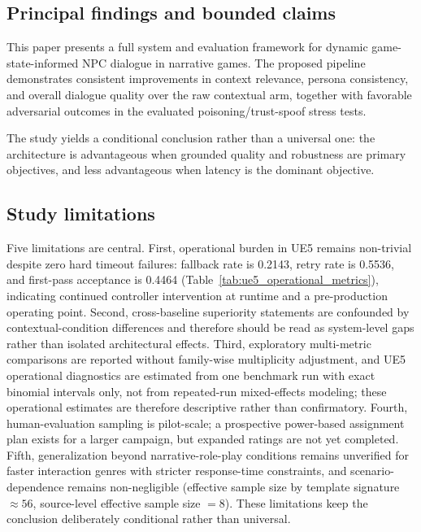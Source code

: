 ﻿\documentclass[a4paper,12pt]{article}
\begin{document}
\subsection{Principal findings and bounded claims}
This paper presents a full system and evaluation framework for dynamic game-state-informed NPC dialogue in narrative games. The proposed pipeline demonstrates consistent improvements in context relevance, persona consistency, and overall dialogue quality over the raw contextual arm, together with favorable adversarial outcomes in the evaluated poisoning/trust-spoof stress tests.

The study yields a conditional conclusion rather than a universal one: the architecture is advantageous when grounded quality and robustness are primary objectives, and less advantageous when latency is the dominant objective.

\subsection{Study limitations}
Five limitations are central. First, operational burden in UE5 remains non-trivial despite zero hard timeout failures: fallback rate is 0.2143, retry rate is 0.5536, and first-pass acceptance is 0.4464 (Table~\ref{tab:ue5_operational_metrics}), indicating continued controller intervention at runtime and a pre-production operating point. Second, cross-baseline superiority statements are confounded by contextual-condition differences and therefore should be read as system-level gaps rather than isolated architectural effects. Third, exploratory multi-metric comparisons are reported without family-wise multiplicity adjustment, and UE5 operational diagnostics are estimated from one benchmark run with exact binomial intervals only, not from repeated-run mixed-effects modeling; these operational estimates are therefore descriptive rather than confirmatory. Fourth, human-evaluation sampling is pilot-scale; a prospective power-based assignment plan exists for a larger campaign, but expanded ratings are not yet completed. Fifth, generalization beyond narrative-role-play conditions remains unverified for faster interaction genres with stricter response-time constraints, and scenario-dependence remains non-negligible (effective sample size by template signature \(\approx 56\), source-level effective sample size \(=8\)). These limitations keep the conclusion deliberately conditional rather than universal.
\end{document}
